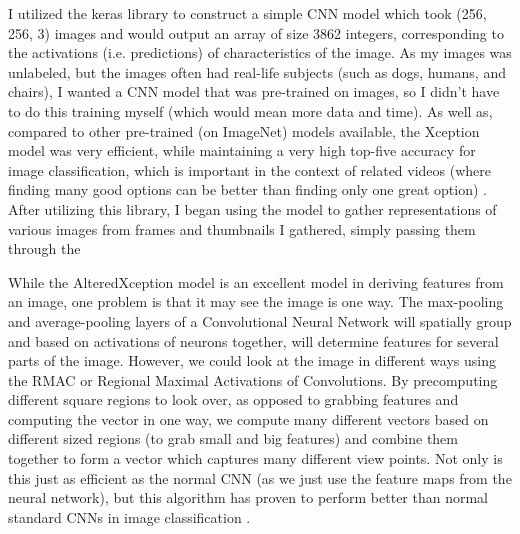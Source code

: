 \documentclass[10pt,twocolumn]{article}
\begin{document}
I utilized the keras library to construct a simple CNN model which took (256, 256, 3) images and would output an array of size 3862 integers, corresponding to the activations (i.e. predictions) of characteristics of the image. As my images was unlabeled, but the images often had real-life subjects (such as dogs, humans, and chairs), I wanted a CNN model that was pre-trained on images, so I didn't have to do this training myself (which would mean more data and time). As well as, compared to other pre-trained (on ImageNet) models available, the Xception model was very efficient, while maintaining a very high top-five accuracy for image classification, which is important in the context of related videos (where finding many good options can be better than finding only one great option) \cite{Stancic2022}. After utilizing this library, I began using the model to gather representations of various images from frames and thumbnails I gathered, simply passing them through the 

While the AlteredXception model is an excellent model in deriving features from an image, one problem is that it may see the image is one way. The max-pooling and average-pooling layers of a Convolutional Neural Network will spatially group and based on activations of neurons together, will determine features for several parts of the image. However, we could look at the image in different ways using the RMAC or Regional Maximal Activations of Convolutions. By precomputing different square regions to look over, as opposed to grabbing features and computing the vector in one way, we compute many different vectors based on different sized regions (to grab small and big features) and combine them together to form a vector which captures many different view points. Not only is this just as efficient as the normal CNN (as we just use the feature maps from the neural network), but this algorithm has proven to perform better than normal standard CNNs in image classification \cite{}.
\end{document}
